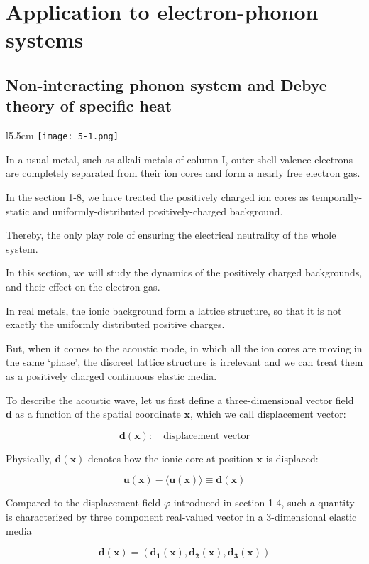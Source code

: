 \chapter{Application to electron-phonon systems}

\section{Non-interacting phonon system and Debye theory of specific heat}

\begin{wrapfigure}{l}{5.5cm}
\texttt{[image: 5-1.png]}
\end{wrapfigure}

In a usual metal, such as alkali metals of column I, outer shell valence electrons are completely separated from their ion cores and form a nearly free electron gas. 

In the section 1-8, we have treated the positively charged ion cores as temporally-static and uniformly-distributed positively-charged background. 

Thereby, the only play role of ensuring the electrical neutrality of the whole system. 

In this section, we will study the dynamics of the positively charged backgrounds, and their effect on the electron gas. 

In real metals, the ionic background form a lattice structure, so that it is not exactly the uniformly distributed positive charges. 

But, when it comes to the acoustic mode, in which all the ion cores are moving in the same `phase', the discreet lattice structure is irrelevant and we can treat them as a positively charged continuous elastic media. 

To describe the acoustic wave, let us first define a three-dimensional vector field $\bm d$ as a function of the spatial coordinate $\bm x$, which we call displacement vector:

\[\bm{d}(\bm{x}):\quad\text{displacement vector} \]

Physically, $\bm{d(x)}$ denotes how the ionic core at position $\bm x$ is displaced:

\[\bm{u(x) - \langle u(x)\rangle \equiv d(x)} \]

Compared to the displacement field $\varphi$ introduced in section 1-4, such a quantity is characterized by three component real-valued vector in a $3$-dimensional elastic media

\[\bm{d(x) = (d_1(x),d_2(x),d_3(x))} \]

